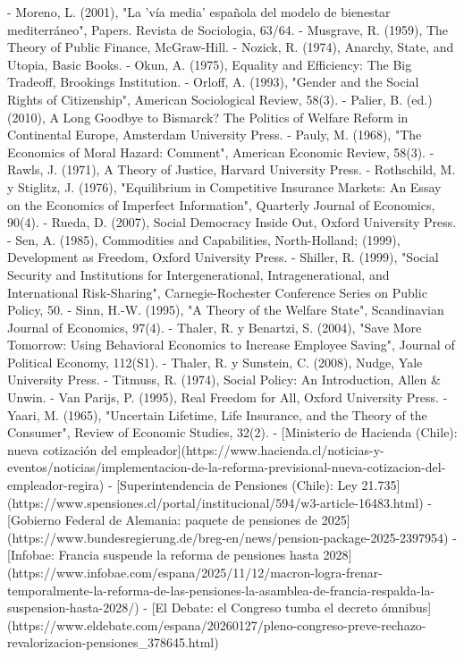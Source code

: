 \documentclass[10pt,a4paper]{article}
\begin{document}
- Moreno, L. (2001), "La 'vía media' española del modelo de bienestar mediterráneo", Papers. Revista de Sociologia, 63/64.
- Musgrave, R. (1959), The Theory of Public Finance, McGraw-Hill.
- Nozick, R. (1974), Anarchy, State, and Utopia, Basic Books.
- Okun, A. (1975), Equality and Efficiency: The Big Tradeoff, Brookings Institution.
- Orloff, A. (1993), "Gender and the Social Rights of Citizenship", American Sociological Review, 58(3).
- Palier, B. (ed.) (2010), A Long Goodbye to Bismarck? The Politics of Welfare Reform in Continental Europe, Amsterdam University Press.
- Pauly, M. (1968), "The Economics of Moral Hazard: Comment", American Economic Review, 58(3).
- Rawls, J. (1971), A Theory of Justice, Harvard University Press.
- Rothschild, M. y Stiglitz, J. (1976), "Equilibrium in Competitive Insurance Markets: An Essay on the Economics of Imperfect Information", Quarterly Journal of Economics, 90(4).
- Rueda, D. (2007), Social Democracy Inside Out, Oxford University Press.
- Sen, A. (1985), Commodities and Capabilities, North-Holland; (1999), Development as Freedom, Oxford University Press.
- Shiller, R. (1999), "Social Security and Institutions for Intergenerational, Intragenerational, and International Risk-Sharing", Carnegie-Rochester Conference Series on Public Policy, 50.
- Sinn, H.-W. (1995), "A Theory of the Welfare State", Scandinavian Journal of Economics, 97(4).
- Thaler, R. y Benartzi, S. (2004), "Save More Tomorrow: Using Behavioral Economics to Increase Employee Saving", Journal of Political Economy, 112(S1).
- Thaler, R. y Sunstein, C. (2008), Nudge, Yale University Press.
- Titmuss, R. (1974), Social Policy: An Introduction, Allen & Unwin.
- Van Parijs, P. (1995), Real Freedom for All, Oxford University Press.
- Yaari, M. (1965), "Uncertain Lifetime, Life Insurance, and the Theory of the Consumer", Review of Economic Studies, 32(2).
- [Ministerio de Hacienda (Chile): nueva cotización del empleador](https://www.hacienda.cl/noticias-y-eventos/noticias/implementacion-de-la-reforma-previsional-nueva-cotizacion-del-empleador-regira)
- [Superintendencia de Pensiones (Chile): Ley 21.735](https://www.spensiones.cl/portal/institucional/594/w3-article-16483.html)
- [Gobierno Federal de Alemania: paquete de pensiones de 2025](https://www.bundesregierung.de/breg-en/news/pension-package-2025-2397954)
- [Infobae: Francia suspende la reforma de pensiones hasta 2028](https://www.infobae.com/espana/2025/11/12/macron-logra-frenar-temporalmente-la-reforma-de-las-pensiones-la-asamblea-de-francia-respalda-la-suspension-hasta-2028/)
- [El Debate: el Congreso tumba el decreto ómnibus](https://www.eldebate.com/espana/20260127/pleno-congreso-preve-rechazo-revalorizacion-pensiones_378645.html)
\end{document}
